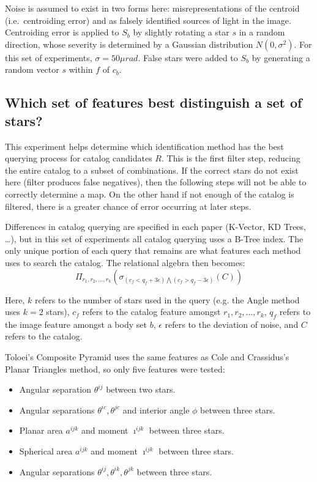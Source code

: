 Noise is assumed to exist in two forms here: misrepresentations of the centroid (i.e.\ centroiding error) and as
falsely identified sources of light in the image.
Centroiding error is applied to $S_b$ by slightly rotating a star $s$ in a random direction, whose severity is
determined by a Gaussian distribution $N(0, \sigma^2)$.
For this set of experiments, $\sigma = 50\mu rad$.
False stars were added to $S_b$ by generating a random vector $s$ within $f$ of $c_b$.

\subsection{Which set of features best distinguish a set of stars?}\label{subsec:featureUniquenessMethods}
This experiment helps determine which identification method has the best querying process for catalog candidates $R$.
This is the first filter step, reducing the entire catalog to a subset of combinations.
If the correct stars do not exist here (filter produces false negatives), then the following steps will not be able to
correctly determine a map.
On the other hand if not enough of the catalog is filtered, there is a greater chance of error occurring at later steps.

Differences in catalog querying are specified in each paper (K-Vector, KD Trees, \ldots), but in this set of
experiments all catalog querying uses a B-Tree index.
The only unique portion of each query that remains are what features each method uses to search the catalog.
The relational algebra then becomes:
\begin{equation}
    \Pi_{r_1, r_2, \ldots, r_k} (\sigma_{(c_f < q_f + 3\epsilon) \bigwedge (c_f > q_f - 3\epsilon)}(C))
\end{equation}

Here, $k$ refers to the number of stars used in the query (e.g. the Angle method uses $k = 2$ stars), $c_f$ refers to
the catalog feature amongst $r_1, r_2, \ldots, r_k$, $q_f$ refers to the image feature amongst a body set $b$,
$\epsilon$ refers to the deviation of noise, and $C$ refers to the catalog.

Toloei's Composite Pyramid uses the same features as Cole and Crassidus's Planar Triangles method, so only five
features were tested:
\begin{itemize}
    \item Angular separation $\theta^{ij}$ between two stars.
    \item Angular separations $\theta^{ic}, \theta^{jc}$ and interior angle $\phi$ between three stars.
    \item Planar area $a^{ijk}$ and moment $\imath^{ijk}$ between three stars.
    \item Spherical area $a^{ijk}$ and moment $\imath^{ijk}$ between three stars.
    \item Angular separations $\theta^{ij}, \theta^{ik}, \theta^{jk}$ between three stars.
\end{itemize}

